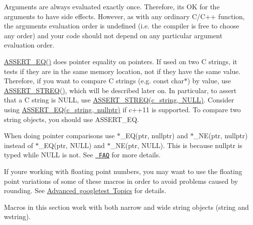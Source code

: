 Arguments are always evaluated exactly once. Therefore, it\textquotesingle{}s OK for the arguments to have side effects. However, as with any ordinary C/\+C++ function, the arguments\textquotesingle{} evaluation order is undefined (i.\+e. the compiler is free to choose any order) and your code should not depend on any particular argument evaluation order.

{\ttfamily \mbox{\hyperlink{googletest-master_2googletest_2include_2gtest_2gtest_8h_a1a6db8b1338ee7040329322b77779086}{A\+S\+S\+E\+R\+T\+\_\+\+E\+Q()}}} does pointer equality on pointers. If used on two C strings, it tests if they are in the same memory location, not if they have the same value. Therefore, if you want to compare C strings (e.\+g. {\ttfamily const char$\ast$}) by value, use {\ttfamily \mbox{\hyperlink{googletest-master_2googletest_2include_2gtest_2gtest_8h_a74f4189ea570bab9a65d47104659ef9c}{A\+S\+S\+E\+R\+T\+\_\+\+S\+T\+R\+E\+Q()}}}, which will be described later on. In particular, to assert that a C string is {\ttfamily N\+U\+LL}, use {\ttfamily \mbox{\hyperlink{_obj__test_2lib_2googletest-release-1_88_81_2googletest_2include_2gtest_2gtest_8h_a74f4189ea570bab9a65d47104659ef9c}{A\+S\+S\+E\+R\+T\+\_\+\+S\+T\+R\+E\+Q(c\+\_\+string, N\+U\+L\+L)}}}. Consider using {\ttfamily \mbox{\hyperlink{_obj__test_2lib_2googletest-release-1_88_81_2googletest_2include_2gtest_2gtest_8h_a1a6db8b1338ee7040329322b77779086}{A\+S\+S\+E\+R\+T\+\_\+\+E\+Q(c\+\_\+string, nullptr)}}} if c++11 is supported. To compare two {\ttfamily string} objects, you should use {\ttfamily A\+S\+S\+E\+R\+T\+\_\+\+EQ}.

When doing pointer comparisons use {\ttfamily $\ast$\+\_\+\+EQ(ptr, nullptr)} and {\ttfamily $\ast$\+\_\+\+NE(ptr, nullptr)} instead of {\ttfamily $\ast$\+\_\+\+EQ(ptr, N\+U\+LL)} and {\ttfamily $\ast$\+\_\+\+NE(ptr, N\+U\+LL)}. This is because {\ttfamily nullptr} is typed while {\ttfamily N\+U\+LL} is not. See \href{faq.md\#why-does-googletest-support-expect_eqnull-ptr-and-assert_eqnull-ptr-but-not-expect_nenull-ptr-and-assert_nenull-ptr}{\texttt{ F\+AQ}} for more details.

If you\textquotesingle{}re working with floating point numbers, you may want to use the floating point variations of some of these macros in order to avoid problems caused by rounding. See \mbox{\hyperlink{_obj__test_2lib_2googletest-release-1_88_81_2googletest_2docs_2advanced_8md}{Advanced googletest Topics}} for details.

Macros in this section work with both narrow and wide string objects ({\ttfamily string} and {\ttfamily wstring}).

